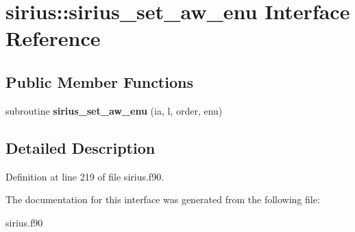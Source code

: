\hypertarget{interfacesirius_1_1sirius__set__aw__enu}{}\section{sirius\+:\+:sirius\+\_\+set\+\_\+aw\+\_\+enu Interface Reference}
\label{interfacesirius_1_1sirius__set__aw__enu}
\subsection*{Public Member Functions}
\begin{DoxyCompactItemize}
\item 
\hypertarget{interfacesirius_1_1sirius__set__aw__enu_aa7554c60d57bccca96d4565e7e92bae8}{}subroutine {\bfseries sirius\+\_\+set\+\_\+aw\+\_\+enu} (ia, l, order, enu)\label{interfacesirius_1_1sirius__set__aw__enu_aa7554c60d57bccca96d4565e7e92bae8}

\end{DoxyCompactItemize}


\subsection{Detailed Description}


Definition at line 219 of file sirius.\+f90.



The documentation for this interface was generated from the following file\+:\begin{DoxyCompactItemize}
\item 
sirius.\+f90\end{DoxyCompactItemize}
